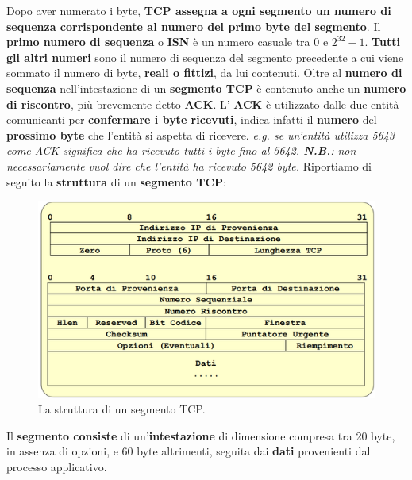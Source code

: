 \documentclass[11pt,a4paper]{article}
\theoremstyle{definition}
\begin{document}
Dopo aver numerato i byte, \textbf{TCP assegna a ogni segmento un numero di sequenza corrispondente al numero del primo byte del segmento}.
Il \textbf{primo numero di sequenza} o \textbf{ISN} è un numero casuale tra 0 e $2^{32} -1$. \textbf{Tutti gli altri numeri }sono il numero di sequenza del segmento precedente a cui viene sommato il numero di byte, \textbf{reali o fittizi}, da lui contenuti.
\newpage
Oltre al \textbf{numero di sequenza } nell'intestazione di un \textbf{segmento TCP} è contenuto anche un \textbf{numero di riscontro}, più brevemente detto \textbf{ACK}. L' \textbf{ACK} è utilizzato dalle due entità comunicanti per \textbf{confermare i byte ricevuti}, indica infatti il \textbf{numero} del \textbf{prossimo byte }che l'entità si aspetta di ricevere.\textit{ e.g. se un'entità utilizza 5643 come ACK significa che ha ricevuto tutti i byte fino al 5642. \underline{\textbf{N.B.}}: non necessariamente vuol dire che l'entità ha ricevuto 5642 byte.}\newline
Riportiamo di seguito la \textbf{struttura} di un \textbf{segmento TCP}:
\begin{figure}[!h]
	\includegraphics[scale=0.5]{Immagini/TCP_segment.png}
	\centering
	\caption{La struttura di un segmento TCP.}
\end{figure}\newline
Il \textbf{segmento consiste} di un'\textbf{intestazione} di dimensione compresa tra 20 byte, in assenza di opzioni, e 60 byte altrimenti, seguita dai \textbf{dati} provenienti dal processo applicativo.
\end{document}
